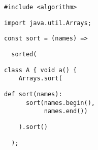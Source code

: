 \documentclass[margin=5pt,varwidth=30ex]{standalone}
\begin{document}
\begin{verbatim}
#include <algorithm>
\end{verbatim}
\begin{verbatim}
import java.util.Arrays;

\end{verbatim}
\begin{verbatim}
const sort = (names) =>
\end{verbatim}
\begin{verbatim}
  sorted(
\end{verbatim}
\begin{verbatim}
class A { void a() {
    Arrays.sort(
\end{verbatim}
\begin{verbatim}
def sort(names):
      sort(names.begin(),
           names.end())
\end{verbatim}
\begin{verbatim}
    ).sort()
\end{verbatim}
\begin{verbatim}
  );
\end{verbatim}
\end{document}
